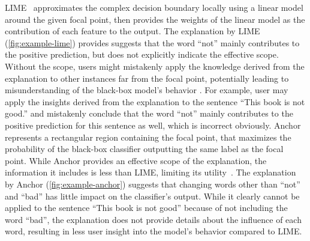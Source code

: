 \documentclass[11pt]{article}
\begin{document}
LIME~\cite{ribeiro2016why} approximates the complex decision boundary
locally using a linear model around the given focal point,
then provides the weights of the linear model as the contribution of each feature
to the output.
The explanation by LIME (\cref{fig:example-lime}) provides suggests that
the word ``not'' mainly contributes to the positive prediction,
but does not explicitly indicate the effective scope.
Without the scope,
users might mistakenly apply the knowledge derived from the explanation
to other instances far from the focal point,
potentially leading to misunderstanding of the black-box model's behavior
\cite{ribeiro2018anchors}.
For example,
user may apply the insights derived from the explanation
to the sentence ``This book is not good.''
and mistakenly conclude that the word ``not''
mainly contributes to the positive prediction for this sentence as well,
which is incorrect obviously.
Anchor~\cite{ribeiro2018anchors} represents a rectangular region
containing the focal point,
that maximizes the probability of the black-box classifier outputting
the same label as the focal point.
While Anchor provides an effective scope of the explanation,
the information it includes is less than LIME,
limiting its utility~\cite{ribeiro2018anchors}.
The explanation by Anchor (\cref{fig:example-anchor})
suggests that changing words other than ``not'' and ``bad''
has little impact on the classifier's output.
While it clearly cannot be applied to the sentence ``This book is not good''
because of not including the word ``bad'',
the explanation does not provide details about the influence of each word,
resulting in less user insight into the model's behavior compared to LIME.

% 
\end{document}
